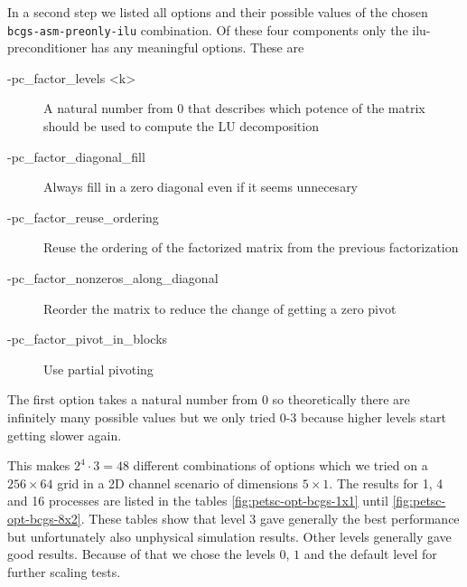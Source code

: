 In a second step we listed all options and their possible values of the chosen
\texttt{bcgs-asm-preonly-ilu} combination. Of these four components only the ilu-preconditioner has any meaningful options. These are
\begin{description}
\item[-pc\_factor\_levels <k>] A natural number from $0$ that describes which
  potence of the matrix should be used to compute the LU decomposition
\item[-pc\_factor\_diagonal\_fill] Always fill in a zero diagonal even if it
  seems unnecesary
\item[-pc\_factor\_reuse\_ordering] Reuse the ordering of the factorized matrix
  from the previous factorization
\item[-pc\_factor\_nonzeros\_along\_diagonal] Reorder the matrix to reduce the
  change of getting a zero pivot
\item[-pc\_factor\_pivot\_in\_blocks] Use partial pivoting
\end{description}
The first option takes a natural number from $0$ so theoretically there are
infinitely many possible values but we only tried $0$-$3$ because higher levels
start getting slower again.

This makes $2^{4} \cdot 3 = 48$ different combinations of options which we tried
on a $256 \times 64$ grid in a 2D channel scenario of dimensions $5 \times
1$. The results for 1, 4 and 16 processes are listed in the tables
\ref{fig:petsc-opt-bcgs-1x1} until \ref{fig:petsc-opt-bcgs-8x2}. These tables
show that level $3$ gave generally the best performance but unfortunately also
unphysical simulation results. Other levels generally gave good results. Because
of that we chose the levels $0$, $1$ and the default level for further scaling
tests.

